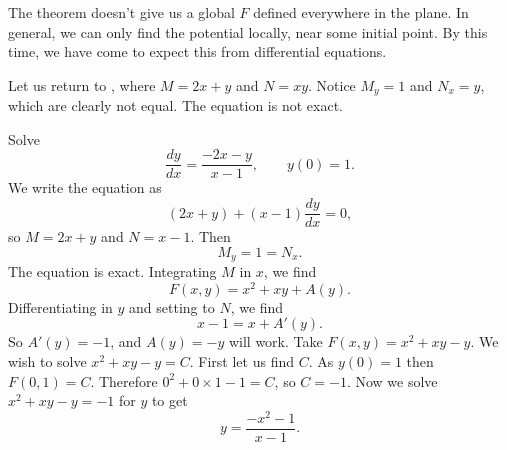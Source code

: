 The theorem doesn't give us a global $F$ defined everywhere in the plane.  In
general, we can only find the potential locally, near some initial point.
By this time, we have come to expect this from differential
equations.

Let us return to , where $M = 2x + y$ and $N = xy$.  
Notice 
$M_y = 1$ and  $N_x =
y$, which are clearly not equal.  The equation is not exact.

\begin{example}
Solve
\begin{equation*}
\frac{dy}{dx} = \frac{-2x-y}{x-1}, \qquad y(0) = 1.
\end{equation*}
We write the equation as
\begin{equation*}
(2x+y) + (x-1)\frac{dy}{dx} = 0 ,
\end{equation*}
so $M = 2x+y$ and $N = x-1$.  Then
\begin{equation*}
M_y = 1 = N_x .
\end{equation*}
The equation is exact.
Integrating $M$ in $x$, we find
\begin{equation*}
F(x,y) = x^2+xy + A(y) .
\end{equation*}
Differentiating in $y$ and setting to $N$, we find
\begin{equation*}
x-1 = x + A'(y) .
\end{equation*}
So $A'(y) = -1$, and $A(y) = -y$ will work.  Take $F(x,y) = x^2+xy-y$.  We
wish to solve $x^2+xy-y = C$.  First let us find $C$.  As $y(0)=1$ then
$F(0,1) = C$.  Therefore $0^2+0\times 1 - 1 = C$, so $C=-1$.  Now we solve
$x^2+xy-y = -1$ for $y$ to get
\begin{equation*}
y = \frac{-x^2-1}{x-1} .
\end{equation*}
\end{example}

